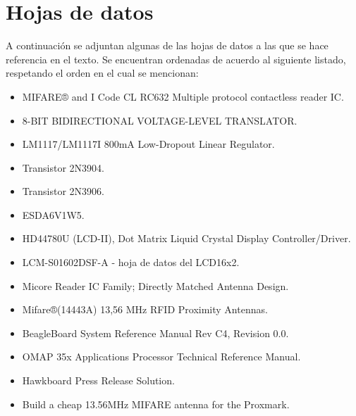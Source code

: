 \chapter{Hojas de datos}\label{HD}

A continuación se adjuntan algunas de las hojas de datos a las que se hace referencia en el texto.
Se encuentran ordenadas de acuerdo al siguiente listado, respetando el orden en el cual se mencionan:

\begin{itemize}
\item MIFARE® and I Code CL RC632 Multiple protocol contactless reader IC.
\item 8-BIT BIDIRECTIONAL VOLTAGE-LEVEL TRANSLATOR.
\item LM1117/LM1117I 800mA Low-Dropout Linear Regulator.
\item Transistor 2N3904.
\item Transistor 2N3906.
\item ESDA6V1W5.
\item HD44780U (LCD-II), Dot Matrix Liquid Crystal Display Controller/Driver.
\item LCM-S01602DSF-A - hoja de datos del LCD16x2.
\item Micore Reader IC Family; Directly Matched Antenna Design.
\item Mifare®(14443A) 13,56 MHz RFID Proximity Antennas.
\item BeagleBoard System Reference Manual Rev C4, Revision 0.0.
\item OMAP 35x Applications Processor Technical Reference Manual.
\item Hawkboard Press Release Solution.
\item Build a cheap 13.56MHz MIFARE antenna for the Proxmark.
\end{itemize}

%

%

%

%

%

%

%

